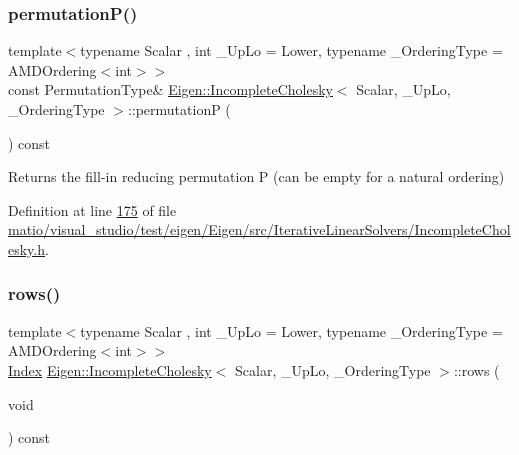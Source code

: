 \subsubsection{\texorpdfstring{permutation\+P()}{permutationP()}\hspace{0.1cm}{\footnotesize\ttfamily [2/2]}}
{\footnotesize\ttfamily template$<$typename Scalar , int \+\_\+\+Up\+Lo = Lower, typename \+\_\+\+Ordering\+Type  = A\+M\+D\+Ordering$<$int$>$$>$ \\
const Permutation\+Type\& \hyperlink{class_eigen_1_1_incomplete_cholesky}{Eigen\+::\+Incomplete\+Cholesky}$<$ Scalar, \+\_\+\+Up\+Lo, \+\_\+\+Ordering\+Type $>$\+::permutationP (\begin{DoxyParamCaption}{ }\end{DoxyParamCaption}) const\hspace{0.3cm}{\ttfamily [inline]}}

\begin{DoxyReturn}{Returns}
the fill-\/in reducing permutation P (can be empty for a natural ordering) 
\end{DoxyReturn}


Definition at line \hyperlink{matio_2visual__studio_2test_2eigen_2_eigen_2src_2_iterative_linear_solvers_2_incomplete_cholesky_8h_source_l00175}{175} of file \hyperlink{matio_2visual__studio_2test_2eigen_2_eigen_2src_2_iterative_linear_solvers_2_incomplete_cholesky_8h_source}{matio/visual\+\_\+studio/test/eigen/\+Eigen/src/\+Iterative\+Linear\+Solvers/\+Incomplete\+Cholesky.\+h}.

\mbox{\label{class_eigen_1_1_incomplete_cholesky_a4780a83266c871782595081021268b5a}} 
\subsubsection{\texorpdfstring{rows()}{rows()}\hspace{0.1cm}{\footnotesize\ttfamily [1/2]}}
{\footnotesize\ttfamily template$<$typename Scalar , int \+\_\+\+Up\+Lo = Lower, typename \+\_\+\+Ordering\+Type  = A\+M\+D\+Ordering$<$int$>$$>$ \\
\hyperlink{namespace_eigen_a62e77e0933482dafde8fe197d9a2cfde}{Index} \hyperlink{class_eigen_1_1_incomplete_cholesky}{Eigen\+::\+Incomplete\+Cholesky}$<$ Scalar, \+\_\+\+Up\+Lo, \+\_\+\+Ordering\+Type $>$\+::rows (\begin{DoxyParamCaption}\item[{void}]{ }\end{DoxyParamCaption}) const\hspace{0.3cm}{\ttfamily [inline]}}

